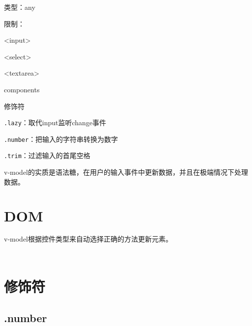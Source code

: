 \begin{compactitem}
\item 类型：any
\item 限制：

\begin{compactenum}
\item <input>
\item <select>
\item <textarea>
\item components
\end{compactenum}

\item 修饰符

\begin{compactenum}
\item \texttt{.lazy}：取代input监听change事件
\item \texttt{.number}：把输入的字符串转换为数字
\item \texttt{.trim}：过滤输入的首尾空格
\end{compactenum}

\end{compactitem}

v-model的实质是语法糖，在用户的输入事件中更新数据，并且在极端情况下处理数据。


\section{DOM}


v-model根据控件类型来自动选择正确的方法更新元素。


\begin{lstlisting}[language=JavaScript]

\end{lstlisting}



\begin{lstlisting}[language=JavaScript]

\end{lstlisting}


\section{修饰符}


\subsection{.number}



\begin{lstlisting}[language=JavaScript]

\end{lstlisting}


